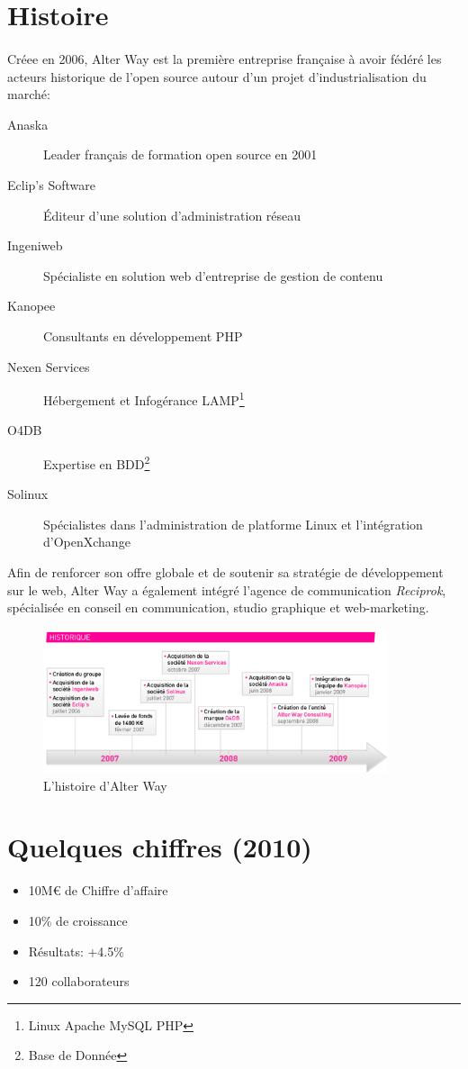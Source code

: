 \section{Histoire}
\paragraph*{}
	Créee en 2006, Alter Way est la première entreprise française à avoir fédéré les acteurs historique
	de l'open source autour d'un projet d'industrialisation du marché:

	\begin{description}
		\item[Anaska] Leader français de formation open source en 2001
		\item[Eclip's Software] Éditeur d'une solution d'administration réseau
		\item[Ingeniweb] Spécialiste en solution web d'entreprise de gestion de contenu
		\item[Kanopee] Consultants en développement PHP
		\item[Nexen Services] Hébergement et Infogérance LAMP\footnote{Linux Apache MySQL PHP}
		\item[O4DB] Expertise en BDD\footnote{Base de Donnée}
		\item[Solinux] Spécialistes dans l'administration de platforme Linux et l'intégration d'OpenXchange
	\end{description}

	Afin de renforcer son offre globale et de soutenir sa stratégie de développement sur le web, Alter Way
	a également intégré l'agence de communication \emph{Reciprok}, spécialisée en conseil en communication,
	studio graphique et web-marketing.

	\begin{figure}
		\centering
		\includegraphics[width=0.9\textwidth]{resource/img/historique_aw}
		\caption{L'histoire d'Alter Way}
	\end{figure}

\section{Quelques chiffres (2010)}
	\begin{itemize}
		\item 10M\euro{} de Chiffre d'affaire
		\item 10\% de croissance
		\item Résultats: +4.5\%
		\item 120 collaborateurs
	\end{itemize}

